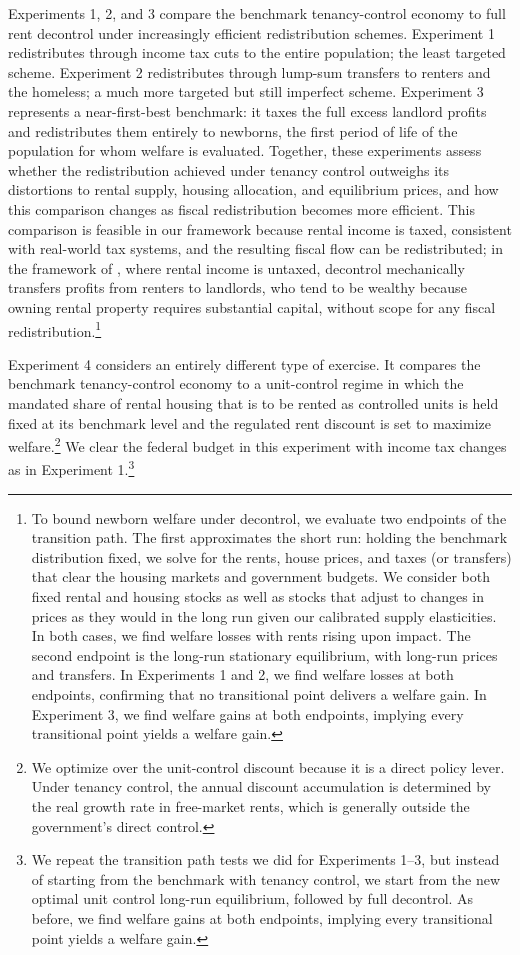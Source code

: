 \documentclass[parskip=full]{article}
\begin{document}
Experiments 1, 2, and 3 compare the benchmark tenancy-control economy to full rent decontrol under increasingly efficient redistribution schemes. Experiment 1 redistributes through income tax cuts to the entire population; the least targeted scheme. Experiment 2 redistributes through lump-sum transfers to renters and the homeless; a much more targeted but still imperfect scheme. Experiment 3 represents a near-first-best benchmark: it taxes the full excess landlord profits and redistributes them entirely to newborns, the first period of life of the population for whom welfare is evaluated. Together, these experiments assess whether the redistribution achieved under tenancy control outweighs its distortions to rental supply, housing allocation, and equilibrium prices, and how this comparison changes as fiscal redistribution becomes more efficient. This comparison is feasible in our framework because rental income is taxed, consistent with real-world tax systems, and the resulting fiscal flow can be redistributed; in the framework of \citet{fmn-2023}, where rental income is untaxed, decontrol mechanically transfers profits from renters to landlords, who tend to be wealthy because owning rental property requires substantial capital, without scope for any fiscal redistribution.\footnote{To bound newborn welfare under decontrol, we evaluate two endpoints of the transition path. The first approximates the short run: holding the benchmark distribution fixed, we solve for the rents, house prices, and taxes (or transfers) that clear the housing markets and government budgets. We consider both fixed rental and housing stocks as well as stocks that adjust to changes in prices as they would in the long run given our calibrated supply elasticities. In both cases, we find welfare losses with rents rising upon impact. The second endpoint is the long-run stationary equilibrium, with long-run prices and transfers. In Experiments 1 and 2, we find welfare losses at both endpoints, confirming that no transitional point delivers a welfare gain. In Experiment 3, we find welfare gains at both endpoints, implying every transitional point yields a welfare gain.}

Experiment 4 considers an entirely different type of exercise. It compares the benchmark tenancy-control economy to a unit-control regime in which the mandated share of rental housing that is to be rented as controlled units is held fixed at its benchmark level and the regulated rent discount is set to maximize welfare.\footnote{We optimize over the unit-control discount because it is a direct policy lever. Under tenancy control, the annual discount accumulation is determined by the real growth rate in free-market rents, which is generally outside the government's direct control.} We clear the federal budget in this experiment with income tax changes as in Experiment 1.\footnote{We repeat the transition path tests we did for Experiments 1--3, but instead of starting from the benchmark with tenancy control, we start from the new optimal unit control long-run equilibrium, followed by full decontrol. As before, we find welfare gains at both endpoints, implying every transitional point yields a welfare gain.}
\end{document}

